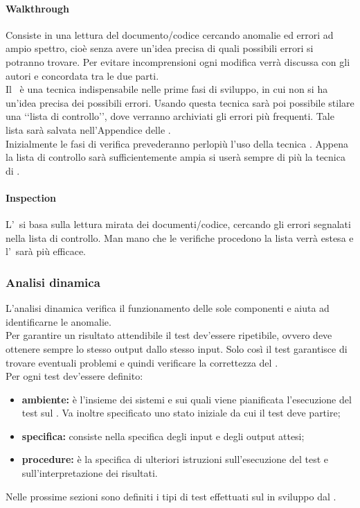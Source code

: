 			\paragraph{Walkthrough}
				Consiste in una lettura del documento/codice cercando anomalie ed errori ad ampio spettro, cioè senza avere un'idea precisa di quali possibili errori si potranno trovare. Per evitare incomprensioni ogni modifica verrà discussa con gli autori e concordata tra le due parti. \\
				Il \ è una tecnica indispensabile nelle prime fasi di sviluppo, in cui non si ha un'idea precisa dei possibili errori. Usando questa tecnica sarà poi possibile stilare una ‘‘lista di controllo’’, dove verranno archiviati gli errori più frequenti. Tale lista sarà salvata nell'Appendice delle \NPdoc. \\ %
				Inizialmente le fasi di verifica prevederanno perlopiù l'uso della tecnica . Appena la lista di controllo sarà sufficientemente ampia si userà sempre di più la tecnica di .
			\paragraph{Inspection}
				L'\ si basa sulla lettura mirata dei documenti/codice, cercando gli errori segnalati nella lista di controllo. Man mano che le verifiche procedono la lista verrà estesa e l'\ sarà più efficace.
		\subsubsection{Analisi dinamica}
			L'analisi dinamica verifica il funzionamento delle sole componenti  e aiuta ad identificarne le anomalie. \\
			Per garantire un risultato attendibile il test dev'essere ripetibile, ovvero deve ottenere sempre lo stesso output dallo stesso input. Solo così il test garantisce di trovare eventuali problemi e quindi verificare la correttezza del  . \\
			Per ogni test dev'essere definito:
			\begin{itemize}
				\item \textbf{ambiente:} è l'insieme dei sistemi  e  sui quali viene pianificata l'esecuzione del test sul . Va inoltre specificato uno stato iniziale da cui il test deve partire;
				\item \textbf{specifica:} consiste nella specifica degli input e degli output attesi;
				\item \textbf{procedure:} è la specifica di ulteriori istruzioni sull'esecuzione del test e sull'interpretazione dei risultati.
			\end{itemize}
			Nelle prossime sezioni sono definiti i tipi di test effettuati sul   in sviluppo dal .
